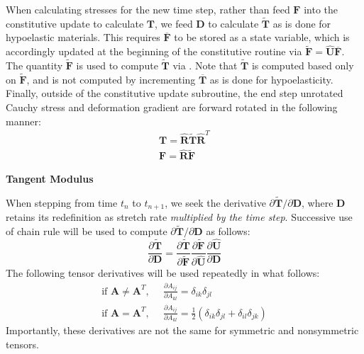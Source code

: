 When calculating stresses for the new time step, rather than feed ${\bm F}$ into the constitutive update to calculate ${\bm T}$, we feed $\bm{D}$ to calculate $\tilde{\bm{T}}$ as is done for hypoelastic materials. This requires $\overline {\bm F}$ to be stored as a state variable, which is accordingly updated at the beginning of the constitutive routine via $\tilde {\bm F} = \hat{\bm U}\overline{\bm F} $. The quantity $\tilde{\bm{F}}$ is used to compute $\tilde{\bm T}$ via . Note that $\tilde{\bm{T}}$ is computed based only on $\tilde{\bm{F}}$, and is not computed by incrementing $\overline{\bm{T}}$ as is done for hypoelasticity. Finally, outside of the constitutive update subroutine, the end step unrotated Cauchy stress and deformation gradient are forward rotated in the following manner:
\begin{gather}
{\bm T} = \hat{\bm R}\tilde{\bm T}\hat{\bm R}^T \\
\bm{F} = \hat{\bm{R}}\tilde{\bm{F}}
\end{gather}

\textbf{Tangent Modulus}

When stepping from time $t_n$ to $t_{n+1}$, we seek the derivative $\partial{\tilde{\bm T}}/\partial {\bm D}$, where ${\bm D}$ retains its redefinition as stretch rate \textit{multiplied by the time step}. Successive use of chain rule will be used to compute $\partial \tilde{\bm{T}}/\partial{\bm{D}}$ as follows:
\begin{equation}
\frac{\partial \tilde{\bm T}}{\partial \bm D} = \frac{\partial \tilde{\bm T}}{\partial \tilde{\bm F}}\frac{\partial \tilde{\bm F}}{\partial {\hat {\bm U}}}\frac{\partial \hat{\bm U}}{\partial {\bm D}} 
\label{eq:tanmod}
\end{equation}
The following tensor derivatives will be used repeatedly in what follows:
\begin{align}
\text{if } {\bm A} \neq {\bm A}^T\text{,}\ \ \ &\frac{\partial A_{ij}}{\partial A_{kl}} = \delta_{ik}{\delta_{jl}} \\
\text{if } {\bm A} = {\bm A}^T\text{,}\ \ \ &\frac{\partial A_{ij}}{\partial A_{kl}} = \frac{1}{2}(\delta_{ik}{\delta_{jl}} + \delta_{il}{\delta_{jk}})
\end{align}
Importantly, these derivatives are not the same for symmetric and nonsymmetric tensors.

